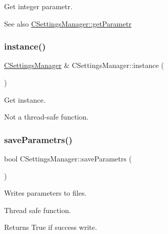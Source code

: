 Get integer parametr. \begin{DoxySeeAlso}{See also}
\mbox{\hyperlink{class_c_settings_manager_ad0796e880134f641f6517d9a5433a877}{C\+Settings\+Manager\+::get\+Parametr}} 
\end{DoxySeeAlso}
\mbox{\label{class_c_settings_manager_a40c0ffaf515eb306a9f83e3d631bcd21}} 
\subsubsection{\texorpdfstring{instance()}{instance()}}
{\footnotesize\ttfamily \mbox{\hyperlink{class_c_settings_manager}{C\+Settings\+Manager}} \& C\+Settings\+Manager\+::instance (\begin{DoxyParamCaption}{ }\end{DoxyParamCaption})\hspace{0.3cm}{\ttfamily [static]}}

Get instance.

Not a thread-\/safe function. \mbox{\label{class_c_settings_manager_a874956b5cb03b94bbb85ae0a5b25733f}} 
\subsubsection{\texorpdfstring{save\+Parametrs()}{saveParametrs()}}
{\footnotesize\ttfamily bool C\+Settings\+Manager\+::save\+Parametrs (\begin{DoxyParamCaption}{ }\end{DoxyParamCaption})}

Writes parameters to files.

Thread safe function.

\begin{DoxyReturn}{Returns}
True if success write. 
\end{DoxyReturn}
\mbox{\label{class_c_settings_manager_aa9efd965120731844f8ff2c2c994e638}} 
